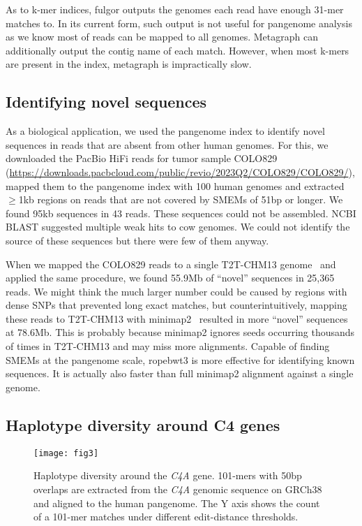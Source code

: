 \documentclass[webpdf,contemporary,large,namedate]{oup-authoring-template}%
\begin{document}
As to k-mer indices, fulgor outputs the genomes each read have enough 31-mer matches to.
In its current form, such output is not useful for pangenome analysis as we know most of reads can be mapped to all genomes.
Metagraph can additionally output the contig name of each match.
However, when most k-mers are present in the index, metagraph is impractically slow.

\subsection{Identifying novel sequences}

As a biological application, we used the pangenome index to identify novel sequences in reads that are absent from other human genomes.
For this, we downloaded the PacBio HiFi reads for tumor sample COLO829 (\url{https://downloads.pacbcloud.com/public/revio/2023Q2/COLO829/COLO829/}),
mapped them to the pangenome index with 100 human genomes
and extracted $\ge$1kb regions on reads that are not covered by SMEMs of 51bp or longer.
We found 95kb sequences in 43 reads.
These sequences could not be assembled.
NCBI BLAST suggested multiple weak hits to cow genomes.
We could not identify the source of these sequences but there were few of them anyway.

When we mapped the COLO829 reads to a single T2T-CHM13 genome~\citep{Nurk:2022up} and applied the same procedure,
we found 55.9Mb of ``novel'' sequences in 25,365 reads.
We might think the much larger number could be caused by regions with dense SNPs that prevented long exact matches,
but counterintuitively, mapping these reads to T2T-CHM13 with minimap2~\citep{Li:2018ab} resulted in more ``novel'' sequences at 78.6Mb.
This is probably because minimap2 ignores seeds occurring thousands of times in T2T-CHM13 and may miss more alignments.
Capable of finding SMEMs at the pangenome scale, ropebwt3 is more effective for identifying known sequences.
It is actually also faster than full minimap2 alignment against a single genome.

\subsection{Haplotype diversity around C4 genes}

\begin{figure}[tb]
\texttt{[image: fig3]}
\caption{Haplotype diversity around the \emph{C4A} gene.
101-mers with 50bp overlaps are extracted from the \emph{C4A} genomic sequence on GRCh38
and aligned to the human pangenome.
The Y axis shows the count of a 101-mer matches under different edit-distance thresholds.}\label{fig:c4}
\end{figure}
\end{document}
